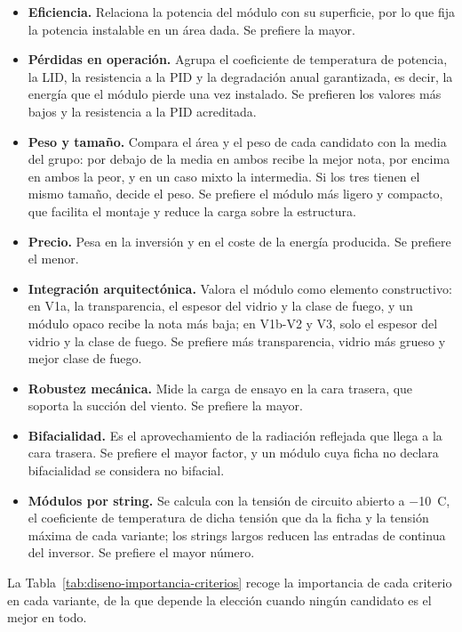 \begin{itemize}
    \item \textbf{Eficiencia.} Relaciona la potencia del módulo con su superficie, por lo que fija la potencia instalable en un área dada. Se prefiere la mayor.
    \item \textbf{Pérdidas en operación.} Agrupa el coeficiente de temperatura de potencia, la \ac{LID}, la resistencia a la PID y la degradación anual garantizada, es decir, la energía que el módulo pierde una vez instalado. Se prefieren los valores más bajos y la resistencia a la PID acreditada.
    \item \textbf{Peso y tamaño.} Compara el área y el peso de cada candidato con la media del grupo: por debajo de la media en ambos recibe la mejor nota, por encima en ambos la peor, y en un caso mixto la intermedia. Si los tres tienen el mismo tamaño, decide el peso. Se prefiere el módulo más ligero y compacto, que facilita el montaje y reduce la carga sobre la estructura.
    \item \textbf{Precio.} Pesa en la inversión y en el coste de la energía producida. Se prefiere el menor.
    \item \textbf{Integración arquitectónica.} Valora el módulo como elemento constructivo: en V1a, la transparencia, el espesor del vidrio y la clase de fuego, y un módulo opaco recibe la nota más baja; en V1b-V2 y V3, solo el espesor del vidrio y la clase de fuego. Se prefiere más transparencia, vidrio más grueso y mejor clase de fuego.
    \item \textbf{Robustez mecánica.} Mide la carga de ensayo en la cara trasera, que soporta la succión del viento. Se prefiere la mayor.
    \item \textbf{Bifacialidad.} Es el aprovechamiento de la radiación reflejada que llega a la cara trasera. Se prefiere el mayor factor, y un módulo cuya ficha no declara bifacialidad se considera no bifacial.
    \item \textbf{Módulos por string.} Se calcula con la tensión de circuito abierto a $-$10~\textdegree{}C, el coeficiente de temperatura de dicha tensión que da la ficha y la tensión máxima de cada variante; los strings largos reducen las entradas de continua del inversor. Se prefiere el mayor número.
\end{itemize}

La Tabla~\ref{tab:diseno-importancia-criterios} recoge la importancia de cada criterio en cada variante, de la que depende la elección cuando ningún candidato es el mejor en todo.

